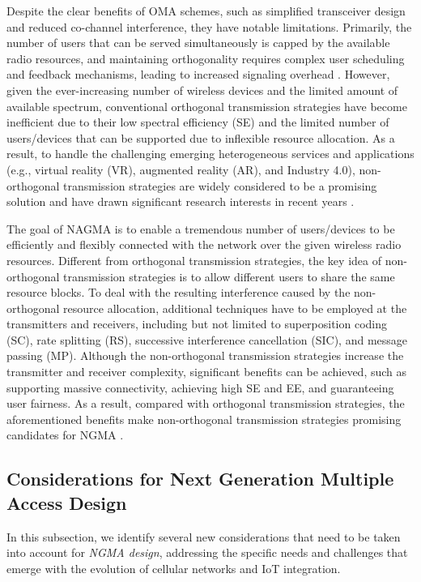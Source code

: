 Despite the clear benefits of OMA schemes, such as simplified transceiver design and reduced co-channel interference, they have notable limitations. Primarily, the number of users that can be served simultaneously is capped by the available radio resources, and maintaining orthogonality requires complex user scheduling and feedback mechanisms, leading to increased signaling overhead \cite{liu2020noma}. However, given the ever-increasing number of wireless devices and the limited amount of available spectrum, conventional orthogonal transmission strategies have become inefficient due to their low spectral efficiency (SE) and the limited number of users/devices that can be supported due to inflexible resource allocation. As a result, to handle the challenging emerging heterogeneous services and applications (e.g., virtual reality (VR), augmented reality (AR), and Industry 4.0), non-orthogonal transmission strategies are widely considered to be a promising solution and have drawn significant research interests in recent years \cite{NAGMA}.

The goal of NAGMA is to enable a tremendous number of users/devices to be efficiently and flexibly connected with the network over the given wireless radio resources. Different from orthogonal transmission strategies, the key idea of non-orthogonal transmission strategies is to allow different users to share the same resource blocks. To deal with the resulting interference caused by the non-orthogonal resource allocation, additional techniques have to be employed at the transmitters and receivers, including but not limited to superposition coding (SC), rate splitting (RS), successive interference cancellation (SIC), and message passing (MP). Although the non-orthogonal transmission strategies increase the transmitter and receiver complexity, significant benefits can be achieved, such as supporting massive connectivity, achieving high SE and EE, and guaranteeing user fairness. As a result, compared with orthogonal transmission strategies, the aforementioned benefits make non-orthogonal transmission strategies promising candidates for NGMA \cite{nagma2}.
\subsection{Considerations for Next Generation Multiple Access Design}

In this subsection, we identify several new considerations that need to be taken into account for \textit{NGMA design}, addressing the specific needs and challenges that emerge with the evolution of cellular networks and IoT integration.

